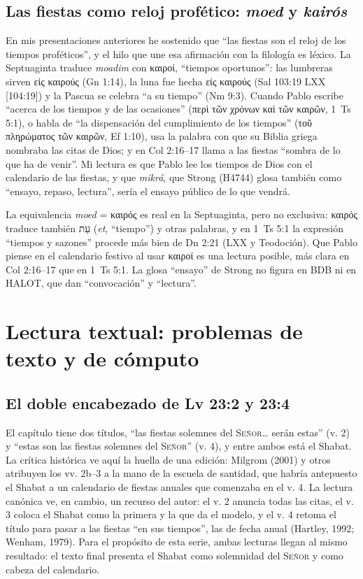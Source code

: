 \documentclass[11pt,letterpaper]{article}
\newcommand{\heb}[1]{\mbox{\foreignlanguage{hebrew}{#1}}}
\newcommand{\grc}[1]{\foreignlanguage{ancientgreek}{#1}}
\newcommand{\SENOR}{\textsc{Señor}}
\begin{document}
\subsection{Las fiestas como reloj profético: \emph{moed} y \emph{kairós}}
En mis presentaciones anteriores he sostenido que ``las fiestas son el reloj de los tiempos proféticos'', y el hilo que une esa afirmación con la filología es léxico. La Septuaginta traduce \emph{moadim} con \grc{καιροί}, ``tiempos oportunos'': las lumbreras sirven \grc{εἰς καιρούς} (Gn 1:14), la luna fue hecha \grc{εἰς καιρούς} (Sal 103:19 LXX [104:19]) y la Pascua se celebra ``a su tiempo'' (Nm 9:3). Cuando Pablo escribe ``acerca de los tiempos y de las ocasiones'' (\grc{περὶ τῶν χρόνων καὶ τῶν καιρῶν}, 1~Ts 5:1), o habla de ``la dispensación del cumplimiento de los tiempos'' (\grc{τοῦ πληρώματος τῶν καιρῶν}, Ef 1:10), usa la palabra con que su Biblia griega nombraba las citas de Dios; y en Col 2:16--17 llama a las fiestas ``sombra de lo que ha de venir''. Mi lectura es que Pablo lee los tiempos de Dios con el calendario de las fiestas, y que \emph{mikrá}, que Strong (H4744) glosa también como ``ensayo, repaso, lectura'', sería el ensayo público de lo que vendrá.

\begin{nota}[Precisión]
La equivalencia \emph{moed} = \grc{καιρός} es real en la Septuaginta, pero no exclusiva: \grc{καιρός} traduce también \heb{עֵת} (\emph{et}, ``tiempo'') y otras palabras, y en 1~Ts 5:1 la expresión ``tiempos y sazones'' procede más bien de Dn 2:21 (LXX y Teodoción). Que Pablo piense en el calendario festivo al usar \grc{καιροί} es una lectura posible, más clara en Col 2:16--17 que en 1~Ts 5:1. La glosa ``ensayo'' de Strong no figura en BDB ni en HALOT, que dan ``convocación'' y ``lectura''.
\end{nota}

\section{Lectura textual: problemas de texto y de cómputo}\label{sec:textual}

\subsection{El doble encabezado de Lv 23:2 y 23:4}
El capítulo tiene dos títulos, ``las fiestas solemnes del \SENOR\ldots{} serán estas'' (v. 2) y ``estas son las fiestas solemnes del \SENOR'' (v. 4), y entre ambos está el Shabat. La crítica histórica ve aquí la huella de una edición: Milgrom (2001) y otros atribuyen los vv. 2b--3 a la mano de la escuela de santidad, que habría antepuesto el Shabat a un calendario de fiestas anuales que comenzaba en el v. 4. La lectura canónica ve, en cambio, un recurso del autor: el v. 2 anuncia todas las citas, el v. 3 coloca el Shabat como la primera y la que da el modelo, y el v. 4 retoma el título para pasar a las fiestas ``en sus tiempos'', las de fecha anual (Hartley, 1992; Wenham, 1979). Para el propósito de esta serie, ambas lecturas llegan al mismo resultado: el texto final presenta el Shabat como solemnidad del \SENOR{} y como cabeza del calendario.
\end{document}
